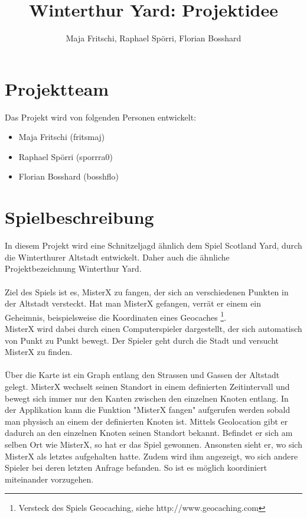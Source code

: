 \documentclass[11pt]{article}
\title{Winterthur Yard: Projektidee}
\author{Maja Fritschi, Raphael Spörri, Florian Bosshard}
\date{}
\begin{document}
\maketitle

\tableofcontents
\newpage

\section{Projektteam}
Das Projekt wird von folgenden Personen entwickelt:
\begin{itemize}
\item Maja Fritschi (fritsmaj)
\item Raphael Spörri (sporrra0)
\item Florian Bosshard (bosshflo)
\end{itemize}


\section{Spielbeschreibung}
In diesem Projekt wird eine Schnitzeljagd ähnlich dem Spiel Scotland Yard, durch die Winterthurer Altstadt entwickelt. Daher auch die ähnliche Projektbezeichnung Winterthur Yard. 
\\\\
Ziel des Spiels ist es, MisterX zu fangen, der sich an verschiedenen Punkten in der Altstadt versteckt. Hat man MisterX gefangen, verrät er einem ein Geheimnis, beispielsweise die Koordinaten eines Geocaches \footnote{Versteck des Spiels Geocaching, siehe http://www.geocaching.com}. 
\\
MisterX wird dabei durch einen Computerspieler dargestellt, der sich automatisch von Punkt zu Punkt bewegt. Der Spieler geht durch die Stadt und versucht MisterX zu finden. 
\\\\
Über die Karte ist ein Graph entlang den Strassen und Gassen der Altstadt gelegt. MisterX wechselt seinen Standort in einem definierten Zeitintervall und bewegt sich immer nur den Kanten zwischen den einzelnen Knoten entlang. In der Applikation kann die Funktion "MisterX fangen" aufgerufen werden sobald man physisch an einem der definierten Knoten ist. Mittels Geolocation gibt er dadurch an den einzelnen Knoten seinen Standort bekannt. Befindet er sich am selben Ort wie MisterX, so hat er das Spiel gewonnen. Ansonsten sieht er, wo sich MisterX als letztes aufgehalten hatte. Zudem wird ihm  angezeigt, wo sich andere Spieler bei deren letzten Anfrage befanden. So ist es möglich koordiniert miteinander vorzugehen.
\end{document}
